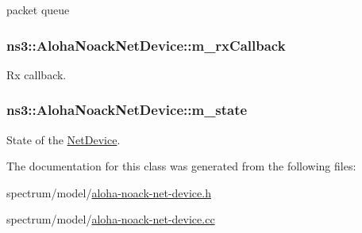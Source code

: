 packet queue 

\subsubsection[{\texorpdfstring{m\+\_\+rx\+Callback}{m_rxCallback}}]{ ns3\+::\+Aloha\+Noack\+Net\+Device\+::m\+\_\+rx\+Callback\hspace{0.3cm}{\ttfamily [private]}}\hypertarget{classns3_1_1AlohaNoackNetDevice_a1b3e4080b2399f5cd2ddf4fc48b9da1a}{}\label{classns3_1_1AlohaNoackNetDevice_a1b3e4080b2399f5cd2ddf4fc48b9da1a}


Rx callback. 

\subsubsection[{\texorpdfstring{m\+\_\+state}{m_state}}]{ ns3\+::\+Aloha\+Noack\+Net\+Device\+::m\+\_\+state\hspace{0.3cm}{\ttfamily [private]}}\hypertarget{classns3_1_1AlohaNoackNetDevice_a97acfcda000e8ec80108cac43682cea0}{}\label{classns3_1_1AlohaNoackNetDevice_a97acfcda000e8ec80108cac43682cea0}


State of the \hyperlink{classns3_1_1NetDevice}{Net\+Device}. 



The documentation for this class was generated from the following files\+:\begin{DoxyCompactItemize}
\item 
spectrum/model/\hyperlink{aloha-noack-net-device_8h}{aloha-\/noack-\/net-\/device.\+h}\item 
spectrum/model/\hyperlink{aloha-noack-net-device_8cc}{aloha-\/noack-\/net-\/device.\+cc}\end{DoxyCompactItemize}
